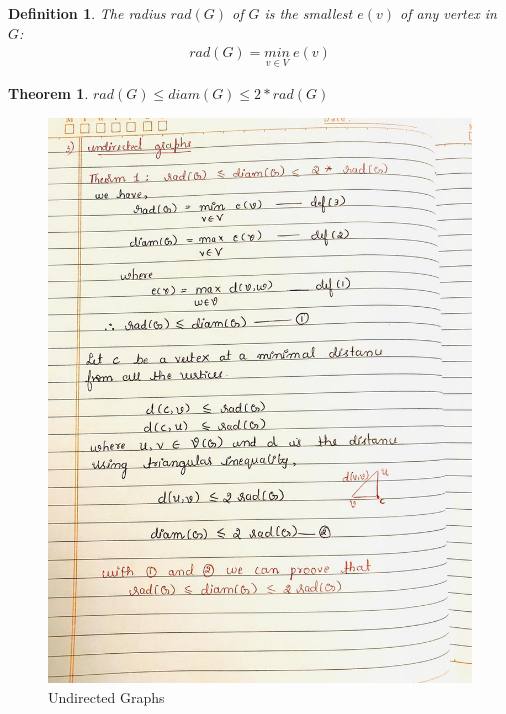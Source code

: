 \documentclass{resources/WeSTassignment}
\newtheorem{definition}{Definition}
\newtheorem{theorem}{Theorem}
\begin{document}
\begin{definition} \label{def:radius}
The \emph{radius} $rad(G)$ of $G$ is the smallest $e(v)$ of any vertex in $G$:
\begin{align*}
    rad(G) = \underset{v \in V}{min}~ e(v)
\end{align*}
\end{definition}

\begin{theorem} \label{thm:rad_diam_2rad}
$rad(G) \leq diam(G) \leq 2 * rad(G)$
\end{theorem}
\begin{figure}[ht]
    \centering
    \includegraphics[scale=0.4]{./resources/3.jpeg}
    \caption{Undirected Graphs}
    \label{fig:Undirected Graphs}
\end{figure}
\end{document}
